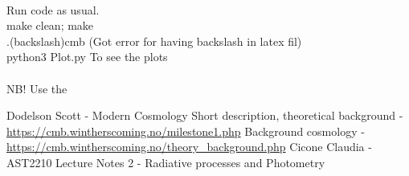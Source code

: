 \documentclass{article}
\begin{document}
\\
Run code as usual.\\
make clean; make\\
.(backslash)cmb         (Got error for having backslash in latex fil)  \\
python3 Plot.py         To see the plots\\
\\
NB! Use the 
\begin{thebibliography}{9}
    Dodelson Scott - Modern Cosmology 
	Short description, theoretical background - \url{https://cmb.wintherscoming.no/milestone1.php} 
	Background cosmology - \url{https://cmb.wintherscoming.no/theory_background.php} 
    Cicone Claudia - AST2210 Lecture Notes 2 - Radiative processes and Photometry 
\end{thebibliography}
\end{document}
